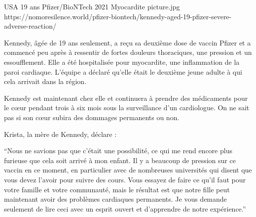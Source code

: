 {USA}
{19 ans}
{Pfizer/BioNTech}
{2021}
{Myocardite}
{picture.jpg}
{https://nomoresilence.world/pfizer-biontech/kennedy-aged-19-pfizer-severe-adverse-reaction/}
{

Kennedy, âgée de 19 ans seulement, a reçu sa deuxième dose de vaccin Pfizer et a
commencé peu après à ressentir de fortes douleurs thoraciques, une pression et
un essoufflement. Elle a été hospitalisée pour myocardite, une inflammation de
la paroi cardiaque. L'équipe a déclaré qu'elle était le deuxième jeune adulte à
qui cela arrivait dans la région.

Kennedy est maintenant chez elle et continuera à prendre des médicaments pour le
cœur pendant trois à six mois sous la surveillance d'un cardiologue. On ne sait
pas si son cœur subira des dommages permanents ou non.

Krista, la mère de Kennedy, déclare :

“Nous ne savions pas que c'était une possibilité, ce qui me rend encore plus
furieuse que cela soit arrivé à mon enfant. Il y a beaucoup de pression sur ce
vaccin en ce moment, en particulier avec de nombreuses universités qui disent
que vous devez l'avoir pour suivre des cours. Vous essayez de faire ce qu'il
faut pour votre famille et votre communauté, mais le résultat est que notre
fille peut maintenant avoir des problèmes cardiaques permanents. Je vous demande
seulement de lire ceci avec un esprit ouvert et d'apprendre de notre
expérience.”

}
